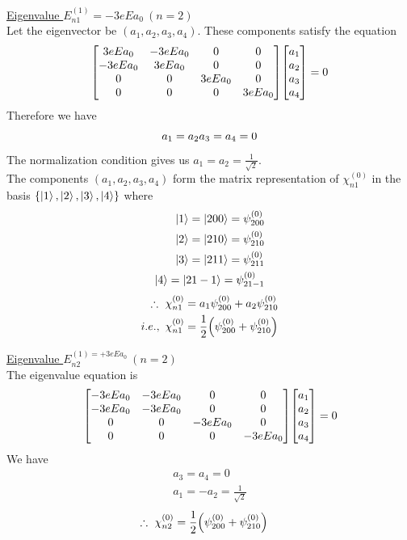 		\underline{Eigenvalue $E_{n 1}^{(1)} = - 3 e E a_0 \ (n=2)$}\\
		Let the eigenvector be $(a_1, a_2, a_3, a_4)$. These components satisfy the equation
		\begin{equation*}
			\mqty[3 e E a_0 & - 3 e E a_0 & 0 & 0 \\
			-3 e E a_0 & 3 e E a_0 & 0 & 0\\
			0 & 0 & 3 e E a_0 & 0\\
			0 & 0 & 0 & 3 e E a_0
			]\mqty[a_1 \\ a_2 \\ a_3 \\ a_4] = 0
		\end{equation*}
		Therefore we have
		\begin{equation*}
			a_1 = a_2 \\
			a_3 = a_4 = 0\\
		\end{equation*}
		The normalization condition gives us $a_1 = a_2 = \frac{1}{\sqrt{2}}$.\\
		
		The components $(a_1, a_2, a_3, a_4)$ form the matrix representation of $\chi_{n 1}^{(0)}$ in the basis $\{\ket{1}, \ket{2}, \ket{3}, \ket{4}\}$ where
		\begin{align*}
			\ket{1} = \ket{2 0 0} = \psi_{2 0 0}^{(0)}\\
			\ket{2} = \ket{2 1 0} = \psi_{2 1 0}^{(0)}\\
			\ket{3} = \ket{2 1 1} = \psi_{2 1 1}^{(0)}\\
			\ket{4} = \ket{2 1 -1} = \psi_{2 1 -1}^{(0)}
		\end{align*}
		\begin{align*}
		\therefore \ \chi_{n 1}^{(0)} &= a_1 \psi_{2 0 0}^{(0)} + a_2 \psi_{2 1 0}^{(0)} \\		
		i.e., \ \chi_{n 1}^{(0)} &= \frac{1}{2} \qty(\psi_{2 0 0}^{(0)} + \psi_{2 1 0}^{(0)})
		\end{align*}
		
		
		
		\underline{Eigenvalue $E_{n 2}^{(1) = + 3 e E a_0}\ (n=2)$}\\
		The eigenvalue equation is
		\begin{equation*}
		\mqty[-3 e E a_0 & - 3 e E a_0 & 0 & 0 \\
		-3 e E a_0 & -3 e E a_0 & 0 & 0\\
		0 & 0 & -3 e E a_0 & 0\\
		0 & 0 & 0 & -3 e E a_0
		]\mqty[a_1 \\ a_2 \\ a_3 \\ a_4] = 0
		\end{equation*}
		We have
		\begin{align*}
		 a_3 = a_4 = 0 \\
		 a_1 = - a_2 = \frac{1}{\sqrt{2}}
		\end{align*}
		\begin{align*}
		\therefore \ \chi_{n 2}^{(0)} &= \frac{1}{2} \qty(\psi_{2 0 0}^{(0)} + \psi_{2 1 0}^{(0)})
		\end{align*}
		
